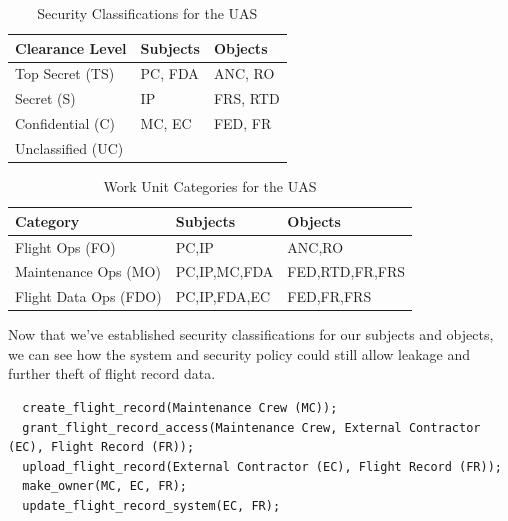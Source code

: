 \documentclass[10pt,journal,compsoc]{IEEEtran}
\begin{document}
\begin{table}[]
  \caption{Security Classifications for the UAS}
  \label{tab:security-classifications}
  \centering
  \begin{tabular}{lll}
  \hline
  \textbf{Clearance Level} & \textbf{Subjects} & \textbf{Objects} \\
  \hline
  Top Secret (TS)          & PC, FDA           & ANC, RO          \\
  Secret (S)               & IP                & FRS, RTD         \\
  Confidential (C)         & MC, EC            & FED, FR          \\
  Unclassified (UC)        &                   &                 
  \end{tabular}
\end{table}

\begin{table}[]
  \caption{Work Unit Categories for the UAS}
  \label{tab:work-unit-categories}
  \centering
  \begin{tabular}{lll}
  \hline
  \textbf{Category}        & \textbf{Subjects} & \textbf{Objects} \\
  \hline
  Flight Ops (FO)          & PC,IP         & ANC,RO          \\
  Maintenance Ops (MO)     & PC,IP,MC,FDA  & FED,RTD,FR,FRS    \\
  Flight Data Ops (FDO)    & PC,IP,FDA,EC  & FED,FR,FRS             
  \end{tabular}
\end{table}

Now that we've established security classifications for our subjects and objects, we can see how the system and security policy could still allow leakage and further theft of flight record data. 

\begin{lstlisting}
  create_flight_record(Maintenance Crew (MC));
  grant_flight_record_access(Maintenance Crew, External Contractor (EC), Flight Record (FR));
  upload_flight_record(External Contractor (EC), Flight Record (FR));
  make_owner(MC, EC, FR);
  update_flight_record_system(EC, FR);
\end{lstlisting}  
\end{document}
